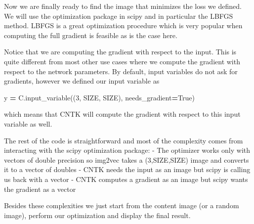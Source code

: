 \documentclass[]{book}
\newenvironment{Shaded}{\begin{snugshade}}{\end{snugshade}}
\newcommand{\DecValTok}[1]{\textcolor[rgb]{0.00,0.00,0.81}{#1}}
\newcommand{\VariableTok}[1]{\textcolor[rgb]{0.00,0.00,0.00}{#1}}
\newcommand{\OperatorTok}[1]{\textcolor[rgb]{0.81,0.36,0.00}{\textbf{#1}}}
\newcommand{\NormalTok}[1]{#1}
\theoremstyle{definition}
\theoremstyle{definition}
\theoremstyle{definition}
\theoremstyle{remark}
\begin{document}
Now we are finally ready to find the image that minimizes the loss we
defined. We will use the optimization package in scipy and in particular
the LBFGS method. LBFGS is a great optimization procedure which is very
popular when computing the full gradient is feasible as is the case
here.

Notice that we are computing the gradient with respect to the input.
This is quite different from most other use cases where we compute the
gradient with respect to the network parameters. By default, input
variables do not ask for gradients, however we defined our input
variable as

\begin{Shaded}
\begin{Highlighting}[]
\NormalTok{y }\OperatorTok{=}\NormalTok{ C.input_variable((}\DecValTok{3}\NormalTok{, SIZE, SIZE), needs_gradient}\OperatorTok{=}\VariableTok{True}\NormalTok{)}
\end{Highlighting}
\end{Shaded}

which means that CNTK will compute the gradient with respect to this
input variable as well.

The rest of the code is straightforward and most of the complexity comes
from interacting with the scipy optimization package: - The optimizer
works only with vectors of double precision so img2vec takes a
(3,SIZE,SIZE) image and converts it to a vector of doubles - CNTK needs
the input as an image but scipy is calling us back with a vector - CNTK
computes a gradient as an image but scipy wants the gradient as a vector

Besides these complexities we just start from the content image (or a
random image), perform our optimization and display the final result.
\end{document}
